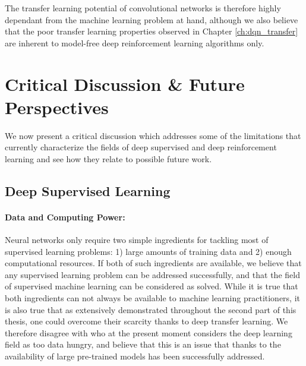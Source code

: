 \begin{enumerate}
The transfer learning potential of convolutional networks is therefore highly dependant from the machine learning problem at hand, although we also believe that the poor transfer learning properties observed in Chapter \ref{ch:dqn_transfer} are inherent to model-free deep reinforcement learning algorithms only.


\end{enumerate}


\section{Critical Discussion \& Future Perspectives}
\label{sec:critical_discussion}

We now present a critical discussion which addresses some of the limitations that currently characterize the fields of deep supervised and deep reinforcement learning and see how they relate to possible future work.

\subsection{Deep Supervised Learning}
\label{sec:supervised_learning}

\paragraph{Data and Computing Power:}
Neural networks only require two simple ingredients for tackling most of supervised learning problems: 1) large amounts of training data and 2) enough computational resources. If both of such ingredients are available, we believe that any supervised learning problem can be addressed successfully, and that the field of supervised machine learning can be considered as solved. While it is true that both ingredients can not always be available to machine learning practitioners, it is also true that as extensively demonstrated throughout the second part of this thesis, one could overcome their scarcity thanks to deep transfer learning. We therefore disagree with \citet{marcus2018deep} who at the present moment considers the deep learning field as too data hungry, and believe that this is an issue that thanks to the availability of large pre-trained models has been successfully addressed.  


